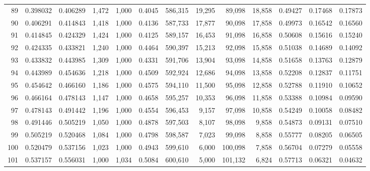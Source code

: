 \begin{tabular}{rrrrrrrrrrrrr}
89  &  0.398032 &  0.406289 &   1,472 &  1,000 &                                     0.4045 &  586,315 &   19,295 &   89,098 &   18,858 &  0.49427 &  0.17468 &  0.17873 \\
90  &  0.406291 &  0.414843 &   1,418 &  1,000 &                                     0.4136 &  587,733 &   17,877 &   90,098 &   17,858 &  0.49973 &  0.16542 &  0.16560 \\
91  &  0.414845 &  0.424329 &   1,424 &  1,000 &                                     0.4125 &  589,157 &   16,453 &   91,098 &   16,858 &  0.50608 &  0.15616 &  0.15240 \\
92  &  0.424335 &  0.433821 &   1,240 &  1,000 &                                     0.4464 &  590,397 &   15,213 &   92,098 &   15,858 &  0.51038 &  0.14689 &  0.14092 \\
93  &  0.433832 &  0.443985 &   1,309 &  1,000 &                                     0.4331 &  591,706 &   13,904 &   93,098 &   14,858 &  0.51658 &  0.13763 &  0.12879 \\
94  &  0.443989 &  0.454636 &   1,218 &  1,000 &                                     0.4509 &  592,924 &   12,686 &   94,098 &   13,858 &  0.52208 &  0.12837 &  0.11751 \\
95  &  0.454642 &  0.466160 &   1,186 &  1,000 &                                     0.4575 &  594,110 &   11,500 &   95,098 &   12,858 &  0.52788 &  0.11910 &  0.10652 \\
96  &  0.466164 &  0.478143 &   1,147 &  1,000 &                                     0.4658 &  595,257 &   10,353 &   96,098 &   11,858 &  0.53388 &  0.10984 &  0.09590 \\
97  &  0.478143 &  0.491442 &   1,196 &  1,000 &                                     0.4554 &  596,453 &    9,157 &   97,098 &   10,858 &  0.54249 &  0.10058 &  0.08482 \\
98  &  0.491446 &  0.505219 &   1,050 &  1,000 &                                     0.4878 &  597,503 &    8,107 &   98,098 &    9,858 &  0.54873 &  0.09131 &  0.07510 \\
99  &  0.505219 &  0.520468 &   1,084 &  1,000 &                                     0.4798 &  598,587 &    7,023 &   99,098 &    8,858 &  0.55777 &  0.08205 &  0.06505 \\
100 &  0.520479 &  0.537156 &   1,023 &  1,000 &                                     0.4943 &  599,610 &    6,000 &  100,098 &    7,858 &  0.56704 &  0.07279 &  0.05558 \\
101 &  0.537157 &  0.556031 &   1,000 &  1,034 &                                     0.5084 &  600,610 &    5,000 &  101,132 &    6,824 &  0.57713 &  0.06321 &  0.04632 \\

\end{tabular}
